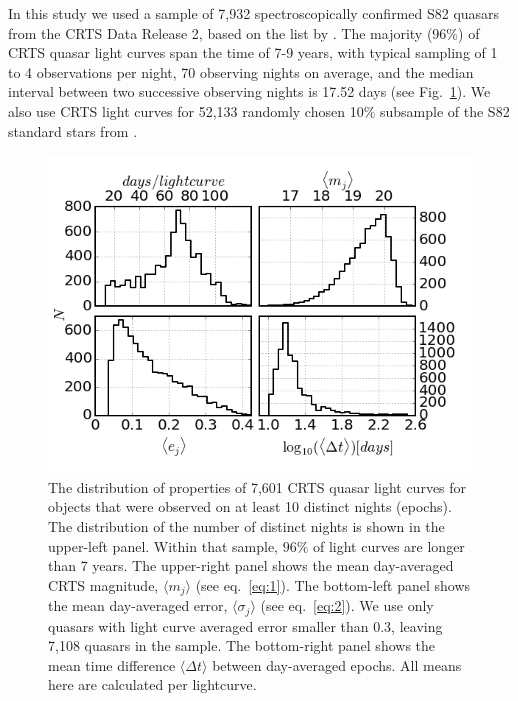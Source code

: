 \documentclass[fleqn,usenatbib]{mnras}
\begin{document}
In this study we used a sample of 7,932 spectroscopically confirmed S82 quasars from the CRTS Data Release 2, based 
on the list by \cite{macleod2012}.  The majority (96\%) of  CRTS quasar light curves span the time of 7-9 years, 
with typical sampling of 1 to 4 observations per night, 70 observing nights on average, and the 
median interval between two successive observing nights is 17.52  days (see Fig.~\ref{fig:1}). We also use CRTS light curves for 52,133 randomly chosen 10\% subsample of the S82 
standard stars from \cite{ivezic2007}. 
\begin{figure}
\vskip -0.2in
\includegraphics[width=1.04\columnwidth]{Fig_1.png}
\vskip -0.1in
\caption{The distribution of properties of 7,601 CRTS quasar light curves for objects that were observed 
on at least 10 distinct nights (epochs). The  distribution of the number of distinct nights is shown in the 
upper-left panel. Within that sample, $96\%$ of light curves are longer than 7 years.  The upper-right panel 
shows the mean day-averaged CRTS magnitude, $\langle  m_{j} \rangle$ (see eq.~\ref{eq:1}). 
The bottom-left panel shows the  mean day-averaged error, $\langle \sigma_{j} \rangle$ (see eq.~\ref{eq:2}). 
We use only quasars with light curve averaged error smaller than 0.3, leaving 7,108 quasars in the sample.
The bottom-right panel shows the mean time difference $\langle \Delta t \rangle$ between day-averaged epochs. 
All means here are calculated per lightcurve. }
\label{fig:1}
\end{figure}
\end{document}
